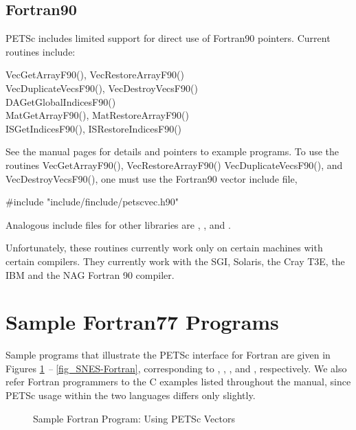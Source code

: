 \subsection{Fortran90}

PETSc includes limited support for direct use of Fortran90 pointers.
Current routines include:
\begin{tabbing}
 VecGetArrayF90(), VecRestoreArrayF90()\\
 VecDuplicateVecsF90(), VecDestroyVecsF90()\\
 DAGetGlobalIndicesF90()\\
 MatGetArrayF90(), MatRestoreArrayF90()\\
 ISGetIndicesF90(), ISRestoreIndicesF90()
\end{tabbing}
See the manual pages for details and pointers to example programs.  To
use the routines VecGetArrayF90(), VecRestoreArrayF90()
VecDuplicateVecsF90(), and VecDestroyVecsF90(), one must
use the Fortran90 vector include file,
\begin{tabbing}
    \#include "include/finclude/petscvec.h90"
\end{tabbing}
Analogous include files for other libraries are ,
, and .

Unfortunately, these routines currently work only on certain machines with 
certain compilers. They currently work with the SGI, Solaris, the Cray T3E, the
IBM and the NAG Fortran 90 compiler.

\section{Sample Fortran77 Programs}
\label{sec_fortran-examples}

Sample programs that illustrate the PETSc interface for Fortran
are given in Figures \ref{fig_vec-Fortran} {\em --} \ref{fig_SNES-Fortran},
corresponding to
, 
, 
\break {}, and 
, respectively.  We also
refer Fortran programmers to the C examples listed throughout the manual,
since PETSc usage within the two languages differs only slightly.

\begin{figure}[H]
{\small
{}
}
\caption{Sample Fortran Program:  Using PETSc Vectors}
\label{fig_vec-Fortran}
\end{figure}

